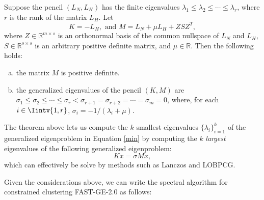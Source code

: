 \begin{theorem}
   Suppose the pencil $(L_N, L_H)$ has the finite eigenvalues $\lambda_1 \le \lambda_2 \le \cdots \le \lambda_r$, where $r$ is the rank of the matrix $L_H$. Let
   \begin{equation}\label{regularization}
      K = - L_H,  \text{ and } M = L_N + \mu L_H + ZSZ^T,
   \end{equation}
   where $Z \in \mathbb R^{m \times s}$ is an orthonormal basis of the common nullspace of $L_N$ and $L_H$, $S \in \mathbb R ^{s \times s}$ is an arbitrary positive definite matrix, and $\mu \in \mathbb R$.
   Then the following holds:
   \begin{enumerate}[(a)]
      \item the matrix $M$ is positive definite.
      \item the generalized eigenvalues of the pencil $(K, M)$ are $\sigma _1 \le \sigma_2 \le \cdots \le \sigma_r < \sigma_{r+1} = \sigma_{r+2} = \cdots = \sigma_m = 0$, where, for each $i \in \Iintv{1,r}$, $\sigma_i = -1/(\lambda_i + \mu)$.
   \end{enumerate}
\end{theorem}

The theorem above lets us compute the $k$ smallest eigenvalues $\{ \lambda_i \}_{i=1}^k$ of the generalized eigenproblem in Equation \vref{min} by computing the $k$ \textit{largest} eigenvalues of the following generalized eigenproblem:
\begin{equation}
K x = \sigma M x,
\end{equation}
which can effectively be solve by methods such as Lanczos and LOBPCG.

Given the considerations above, we can write the spectral algorithm for constrained clustering FAST-GE-2.0 as follows:

